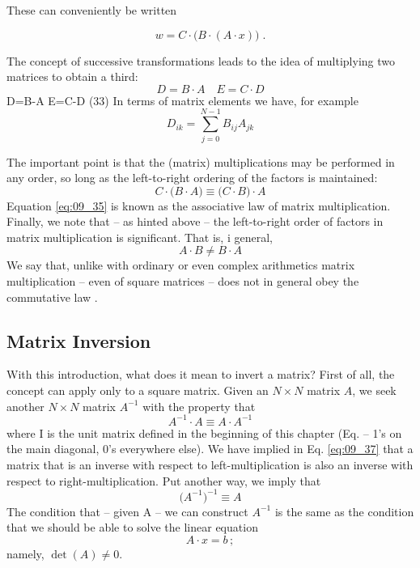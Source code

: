 These can conveniently be written

\begin{equation}
    \label{eq:09_32}
    w=C \cdot \Big( B \cdot (A \cdot x) \Big) \; .%
\end{equation}

The concept of successive transformations leads to the idea of
multiplying two matrices to obtain a third:
\begin{equation}
    \label{eq:09_33}
    D = B \cdot A \quad E = C \cdot D
\end{equation}
D=B-A E=C-D (33)
In terms of matrix elements we have, for example
\begin{equation}
    \label{eq:09_34}
    D_{ik} = \sum_{j=0}^{N-1} B_{ij} A_{jk}
\end{equation}

The important point is that the (matrix) multiplications may be
performed in any order, so long as the left-to-right ordering of
the factors is maintained:
\begin{equation}
    \label{eq:09_35}
    C \cdot \big( B \cdot A \big) \equiv \big( C \cdot B \big) \cdot A
\end{equation}
Equation \ref{eq:09_35} is known as the associative law of matrix
multiplication. Finally, we note that -- as hinted above -- the left-to-right
order of factors in matrix multiplication is significant. That is, i
general,
\begin{equation}
    \label{eq:09_36}
    A \cdot B \neq B \cdot A
\end{equation}
We say that, unlike with ordinary or even complex arithmetics
matrix multiplication -- even of square matrices -- does not in
general obey the commutative law .

\subsection{Matrix Inversion}
With this introduction, what does it mean to invert a matrix? First
of all, the concept can apply only to a square matrix. Given an
$N \times N$ matrix $A$, we seek another $N \times N$ matrix $A^{-1}$ with the property that
\begin{equation}
    \label{eq:09_37}
    A^{-1} \cdot A \equiv A \cdot A^{-1}
\end{equation} 
where I is the unit matrix defined in the beginning of this chapter
(Eq. -- 1's on the main diagonal, 0's everywhere else). We have
implied in Eq. \ref{eq:09_37} that a matrix that is an inverse with respect to
left-multiplication is also an inverse with respect to right-multiplication. Put another way, we imply that
\begin{equation}
    \label{eq:09_38}
    \Big(A^{-1} \Big)^{-1} \equiv A
\end{equation} 
The condition that -- given A -- we can construct $A^{-1}$ is the same
as the condition that we should be able to solve the linear equation
\begin{equation*}
    A \cdot x = b \,;
\end{equation*} 
 namely, $\det(A) \neq 0$.

